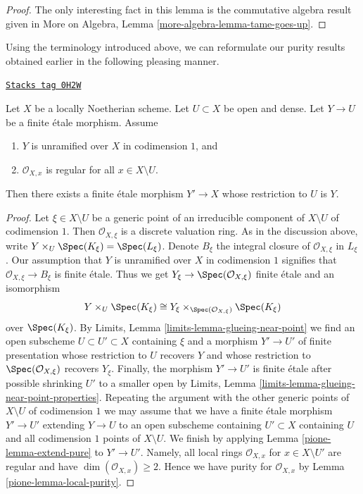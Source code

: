 \begin{proof}
The only interesting fact in this lemma is the commutative algebra
result given in More on Algebra, Lemma \ref{more-algebra-lemma-tame-goes-up}.
\end{proof}

Using the terminology introduced above, we can reformulate our
purity results obtained earlier in the following pleasing manner.

\begin{lemma}
\label{pione-lemma-purity-one-divisor-general}
\href{https://stacks.math.columbia.edu/tag/0H2W}{\texttt{Stacks tag 0H2W}}

Let $X$ be a locally Noetherian scheme. Let $U \subset X$ be open and dense.
Let $Y \to U$ be a finite \'etale morphism. Assume
\begin{enumerate}
\item $Y$ is unramified over $X$ in codimension $1$, and
\item $\mathcal{O}_{X, x}$ is regular for all $x \in X \setminus U$.
\end{enumerate}
Then there exists a finite \'etale morphism $Y' \to X$
whose restriction to $U$ is $Y$.
\end{lemma}

\begin{proof}

Let $\xi \in X \setminus U$ be a generic point of an irreducible component
of $X \setminus U$ of codimension $1$. Then $\mathcal{O}_{X, \xi}$ is a
discrete valuation ring. As in the discussion above, write
$Y \times_U \Spec(K_\xi) = \Spec(L_\xi)$.
Denote $B_\xi$ the integral closure of $\mathcal{O}_{X, \xi}$ in
$L_\xi$. Our assumption that $Y$ is unramified over $X$ in codimension $1$
signifies that $\mathcal{O}_{X, \xi} \to B_\xi$ is finite \'etale.
Thus we get $Y_\xi \to \Spec(\mathcal{O}_{X, \xi})$ finite
\'etale and an isomorphism
$$
Y \times_U \Spec(K_\xi) \cong
Y_\xi \times_{\Spec(\mathcal{O}_{X, \xi})} \Spec(K_\xi)
$$
over $\Spec(K_\xi)$.
By Limits, Lemma \ref{limits-lemma-glueing-near-point}
we find an open subscheme $U \subset U' \subset X$
containing $\xi$ and a morphism $Y' \to U'$ of finite presentation
whose restriction to $U$ recovers $Y$ and
whose restriction to $\Spec(\mathcal{O}_{X, \xi})$ recovers $Y_\xi$.
Finally, the morphism $Y' \to U'$ is finite \'etale
after possible shrinking $U'$ to a smaller open by
Limits, Lemma \ref{limits-lemma-glueing-near-point-properties}.
Repeating the argument with the other generic points of
$X \setminus U$ of codimension $1$ we may assume that we have
a finite \'etale morphism $Y' \to U'$ extending $Y \to U$
to an open subscheme containing $U' \subset X$ containing $U$
and all codimension $1$ points of $X \setminus U$.
We finish by applying Lemma \ref{pione-lemma-extend-pure}
to $Y' \to U'$. Namely, all local rings $\mathcal{O}_{X, x}$
for $x \in X \setminus U'$ are regular and
have $\dim(\mathcal{O}_{X, x}) \geq 2$. Hence we have
purity for $\mathcal{O}_{X, x}$ by Lemma \ref{pione-lemma-local-purity}.
\end{proof}

